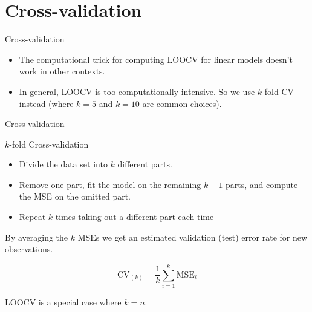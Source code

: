 \documentclass[14pt]{beamer}
\begin{document}
\section{Cross-validation}


\begin{frame}{Cross-validation}

\begin{itemize}
\item The computational trick for computing LOOCV for linear models doesn't work in other contexts.

\item In general, LOOCV is too computationally intensive. So we use $k$-fold CV instead (where $k=5$ and $k=10$ are common choices).
\end{itemize}

\end{frame}


\begin{frame}{Cross-validation}


\end{frame}

\begin{frame}{$k$-fold Cross-validation}

\begin{itemize}
\item Divide the data set into $k$ different parts.
\item Remove one part, fit the model on the remaining
$k-1$ parts, and compute the MSE on the omitted part.
\item Repeat $k$ times taking out a different part each time
\end{itemize}\pause

By averaging the $k$ MSEs we get an estimated
validation (test) error rate for new observations.

\begin{block}{}
\[
\text{CV}_{(k)} = \frac{1}{k}\sum_{i=1}^k \text{MSE}_i
\]
\end{block}\pause

LOOCV is a special case where $k=n$.
\end{frame}
\end{document}
